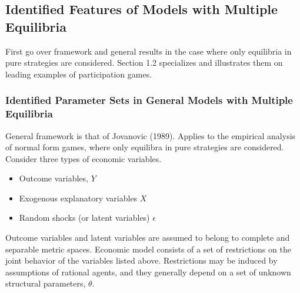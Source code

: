 \subsection{Identified Features of Models with Multiple Equilibria}
First go over framework and general results in the case where only equilibria in pure strategies are considered. Section 1.2 specializes and illustrates them on leading examples of participation games.

\subsubsection{Identified Parameter Sets in General Models with Multiple Equilibria}

General framework is that of Jovanovic (1989). Applies to the empirical analysis of normal form games, where only equilibra in pure strategies are considered. Consider three types of economic variables.
\begin{itemize}
	\item Outcome variables, $Y$
	\item Exogenous explanatory variables $X$
	\item Random shocks (or latent variables) $\epsilon$
\end{itemize}
Outcome variables and latent variables are assumed to belong to complete and separable metric spaces. Economic model consists of a set of restrictions on the joint behavior of the variables listed above. Restrictions may be induced by assumptions of rational agents, and they generally depend on a set of unknown structural parameters, $\theta$.

